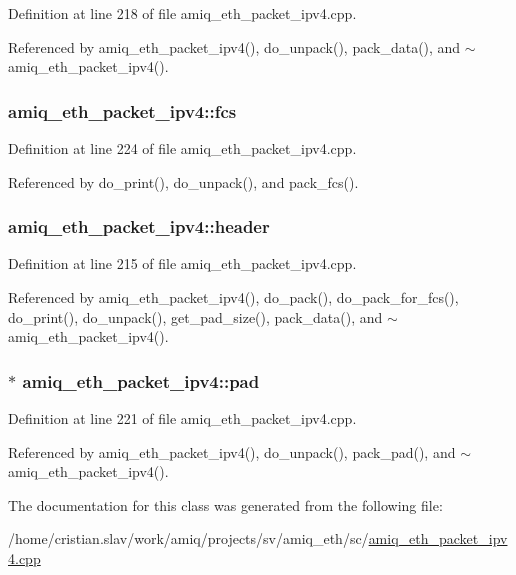 Definition at line 218 of file amiq\_\-eth\_\-packet\_\-ipv4.cpp.

Referenced by amiq\_\-eth\_\-packet\_\-ipv4(), do\_\-unpack(), pack\_\-data(), and $\sim$amiq\_\-eth\_\-packet\_\-ipv4().\hypertarget{classamiq__eth__packet__ipv4_aaaedb42289e1a245801096d885a714b6}{
\subsubsection[{fcs}]{ {\bf amiq\_\-eth\_\-packet\_\-ipv4::fcs}}}
\label{classamiq__eth__packet__ipv4_aaaedb42289e1a245801096d885a714b6}


Definition at line 224 of file amiq\_\-eth\_\-packet\_\-ipv4.cpp.

Referenced by do\_\-print(), do\_\-unpack(), and pack\_\-fcs().\hypertarget{classamiq__eth__packet__ipv4_af1028494effe0d4be6fd2f57088de03e}{
\subsubsection[{header}]{ {\bf amiq\_\-eth\_\-packet\_\-ipv4::header}}}
\label{classamiq__eth__packet__ipv4_af1028494effe0d4be6fd2f57088de03e}


Definition at line 215 of file amiq\_\-eth\_\-packet\_\-ipv4.cpp.

Referenced by amiq\_\-eth\_\-packet\_\-ipv4(), do\_\-pack(), do\_\-pack\_\-for\_\-fcs(), do\_\-print(), do\_\-unpack(), get\_\-pad\_\-size(), pack\_\-data(), and $\sim$amiq\_\-eth\_\-packet\_\-ipv4().\hypertarget{classamiq__eth__packet__ipv4_a093b46458ac73198c5e397bb5f84c43e}{
\subsubsection[{pad}]{$\ast$ {\bf amiq\_\-eth\_\-packet\_\-ipv4::pad}}}
\label{classamiq__eth__packet__ipv4_a093b46458ac73198c5e397bb5f84c43e}


Definition at line 221 of file amiq\_\-eth\_\-packet\_\-ipv4.cpp.

Referenced by amiq\_\-eth\_\-packet\_\-ipv4(), do\_\-unpack(), pack\_\-pad(), and $\sim$amiq\_\-eth\_\-packet\_\-ipv4().

The documentation for this class was generated from the following file:\begin{DoxyCompactItemize}
\item 
/home/cristian.slav/work/amiq/projects/sv/amiq\_\-eth/sc/\hyperlink{amiq__eth__packet__ipv4_8cpp}{amiq\_\-eth\_\-packet\_\-ipv4.cpp}\end{DoxyCompactItemize}
